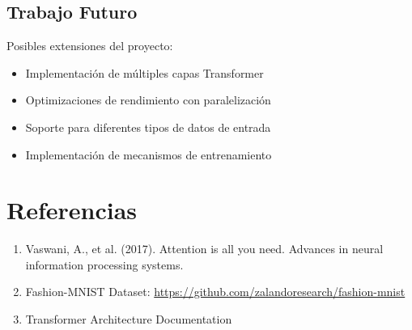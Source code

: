 \documentclass[12pt,a4paper]{article}
\begin{document}
\subsection{Trabajo Futuro}

Posibles extensiones del proyecto:
\begin{itemize}
    \item Implementación de múltiples capas Transformer
    \item Optimizaciones de rendimiento con paralelización
    \item Soporte para diferentes tipos de datos de entrada
    \item Implementación de mecanismos de entrenamiento
\end{itemize}

\section{Referencias}

\begin{enumerate}
    \item Vaswani, A., et al. (2017). Attention is all you need. Advances in neural information processing systems.
    \item Fashion-MNIST Dataset: \url{https://github.com/zalandoresearch/fashion-mnist}
    \item Transformer Architecture Documentation
\end{enumerate}
\end{document}
